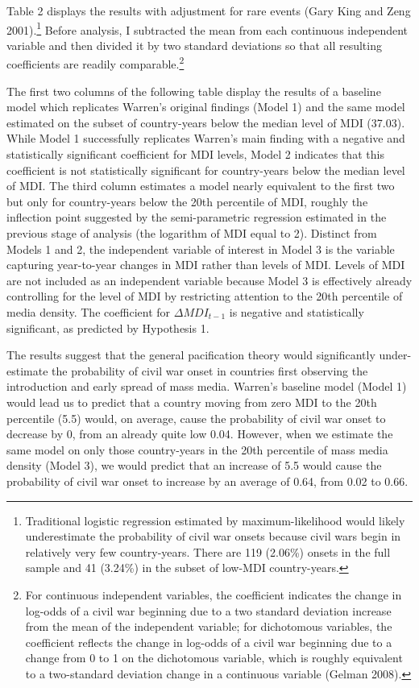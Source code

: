 \documentclass[11pt,article,oneside]{memoir}
\begin{document}
Table 2 displays the results with adjustment for rare events (Gary King
and Zeng 2001).\footnote{Traditional logistic regression estimated by
  maximum-likelihood would likely underestimate the probability of civil
  war onsets because civil wars begin in relatively very few
  country-years. There are 119 (2.06\%) onsets in the full sample and 41
  (3.24\%) in the subset of low-MDI country-years.} Before analysis, I
subtracted the mean from each continuous independent variable and then
divided it by two standard deviations so that all resulting coefficients
are readily comparable.\footnote{For continuous independent variables,
  the coefficient indicates the change in log-odds of a civil war
  beginning due to a two standard deviation increase from the mean of
  the independent variable; for dichotomous variables, the coefficient
  reflects the change in log-odds of a civil war beginning due to a
  change from 0 to 1 on the dichotomous variable, which is roughly
  equivalent to a two-standard deviation change in a continuous variable
  (Gelman 2008).}

The first two columns of the following table display the results of a
baseline model which replicates Warren's original findings (Model 1) and
the same model estimated on the subset of country-years below the median
level of MDI (37.03). While Model 1 successfully replicates Warren's
main finding with a negative and statistically significant coefficient
for MDI levels, Model 2 indicates that this coefficient is not
statistically significant for country-years below the median level of
MDI. The third column estimates a model nearly equivalent to the first
two but only for country-years below the 20th percentile of MDI, roughly
the inflection point suggested by the semi-parametric regression
estimated in the previous stage of analysis (the logarithm of MDI equal
to 2). Distinct from Models 1 and 2, the independent variable of
interest in Model 3 is the variable capturing year-to-year changes in
MDI rather than levels of MDI. Levels of MDI are not included as an
independent variable because Model 3 is effectively already controlling
for the level of MDI by restricting attention to the 20th percentile of
media density. The coefficient for $\Delta$$MDI_{t-1}$ is negative and
statistically significant, as predicted by Hypothesis 1.

The results suggest that the general pacification theory would
significantly under-estimate the probability of civil war onset in
countries first observing the introduction and early spread of mass
media. Warren's baseline model (Model 1) would lead us to predict that a
country moving from zero MDI to the 20th percentile (5.5) would, on
average, cause the probability of civil war onset to decrease by 0, from
an already quite low 0.04. However, when we estimate the same model on
only those country-years in the 20th percentile of mass media density
(Model 3), we would predict that an increase of 5.5 would cause the
probability of civil war onset to increase by an average of 0.64, from
0.02 to 0.66.
\end{document}
